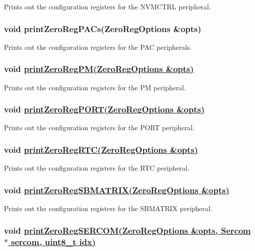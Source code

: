 Prints out the configuration registers for the {\ttfamily N\+V\+M\+C\+T\+RL} peripheral.

\subsubsection*{void print\+Zero\+Reg\+P\+A\+Cs(\+Zero\+Reg\+Options \&opts)}

Prints out the configuration registers for the {\ttfamily P\+AC} peripherals.

\subsubsection*{void \hyperlink{_zero_regs_8h_a1807ae19c29483ee063bd225c40e0d36}{print\+Zero\+Reg\+P\+M(\+Zero\+Reg\+Options \&opts)}}

Prints out the configuration registers for the {\ttfamily PM} peripheral.

\subsubsection*{void \hyperlink{_zero_regs_8h_ac515fdec9d58f6339d3e38cc33c6f74f}{print\+Zero\+Reg\+P\+O\+R\+T(\+Zero\+Reg\+Options \&opts)}}

Prints out the configuration registers for the {\ttfamily P\+O\+RT} peripheral.

\subsubsection*{void \hyperlink{_zero_regs_8h_abd5756f7cbf2e09db78469867a6c5051}{print\+Zero\+Reg\+R\+T\+C(\+Zero\+Reg\+Options \&opts)}}

Prints out the configuration registers for the {\ttfamily R\+TC} peripheral.

\subsubsection*{void \hyperlink{_zero_regs_8h_a91755cc900313248c2a65a925cd46c41}{print\+Zero\+Reg\+S\+B\+M\+A\+T\+R\+I\+X(\+Zero\+Reg\+Options \&opts)}}

Prints out the configuration registers for the {\ttfamily S\+B\+M\+A\+T\+R\+IX} peripheral.

\subsubsection*{void \hyperlink{_zero_regs_8h_a7db1a4f0d10e2e3efcd108837d85ee49}{print\+Zero\+Reg\+S\+E\+R\+C\+O\+M(\+Zero\+Reg\+Options \&opts, Sercom$\ast$ sercom, uint8\+\_\+t idx)}}

